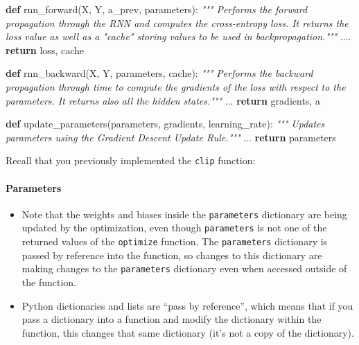\documentclass[11pt]{article}
\providecommand{\tightlist}{%
      \setlength{\itemsep}{0pt}\setlength{\parskip}{0pt}}
\newenvironment{Shaded}{}{}
\newcommand{\KeywordTok}[1]{\textcolor[rgb]{0.00,0.44,0.13}{\textbf{{#1}}}}
\newcommand{\CommentTok}[1]{\textcolor[rgb]{0.38,0.63,0.69}{\textit{{#1}}}}
\newcommand{\NormalTok}[1]{{#1}}
\newcommand{\ControlFlowTok}[1]{\textcolor[rgb]{0.00,0.44,0.13}{\textbf{{#1}}}}
\begin{document}
\begin{Shaded}
\begin{Highlighting}[]
\KeywordTok{def}\NormalTok{ rnn\_forward(X, Y, a\_prev, parameters):}
    \CommentTok{""" Performs the forward propagation through the RNN and computes the cross{-}entropy loss.}
\CommentTok{    It returns the loss\textquotesingle{} value as well as a "cache" storing values to be used in backpropagation."""}
\NormalTok{    ....}
    \ControlFlowTok{return}\NormalTok{ loss, cache}
    
\KeywordTok{def}\NormalTok{ rnn\_backward(X, Y, parameters, cache):}
    \CommentTok{""" Performs the backward propagation through time to compute the gradients of the loss with respect}
\CommentTok{    to the parameters. It returns also all the hidden states."""}
\NormalTok{    ...}
    \ControlFlowTok{return}\NormalTok{ gradients, a}

\KeywordTok{def}\NormalTok{ update\_parameters(parameters, gradients, learning\_rate):}
    \CommentTok{""" Updates parameters using the Gradient Descent Update Rule."""}
\NormalTok{    ...}
    \ControlFlowTok{return}\NormalTok{ parameters}
\end{Highlighting}
\end{Shaded}

Recall that you previously implemented the \texttt{clip} function:

    \hypertarget{parameters}{%
\paragraph{Parameters}\label{parameters}}

\begin{itemize}
\tightlist
\item
  Note that the weights and biases inside the \texttt{parameters}
  dictionary are being updated by the optimization, even though
  \texttt{parameters} is not one of the returned values of the
  \texttt{optimize} function. The \texttt{parameters} dictionary is
  passed by reference into the function, so changes to this dictionary
  are making changes to the \texttt{parameters} dictionary even when
  accessed outside of the function.
\item
  Python dictionaries and lists are ``pass by reference'', which means
  that if you pass a dictionary into a function and modify the
  dictionary within the function, this changes that same dictionary
  (it's not a copy of the dictionary).
\end{itemize}
\end{document}
